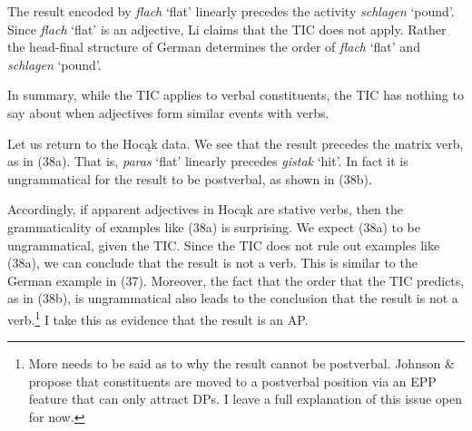\documentclass[output=paper]{LSP/langsci}
\begin{document}
The result encoded by \textit{flach} `flat' linearly precedes the activity \textit{schlagen} `pound'. Since \textit{flach} `flat' is an adjective, Li claims that the TIC does not apply. Rather the head-final structure of German determines the order of \textit{flach} `flat' and \textit{schlagen} `pound'. 

In summary, while the TIC applies to verbal constituents, the TIC has nothing to say about when adjectives form similar events with verbs.

Let us return to the Hocąk data. We see that the result precedes the matrix verb, as in (38a). That is, \textit{paras} `flat' linearly precedes \textit{gistak} `hit'. In fact it is ungrammatical for the result to be postverbal, as shown in (38b).

\begin{exe}
\ex
\begin{xlist}



\end{xlist}
\end{exe}

Accordingly, if apparent adjectives in Hocąk are stative verbs, then the grammaticality of examples like (38a) is surprising. We expect (38a) to be ungrammatical, given the TIC. Since the TIC does not rule out examples like (38a), we can conclude that the result is not a verb. This is similar to the German example in (37). Moreover, the fact that the order that the TIC predicts, as in (38b), is ungrammatical also leads to the conclusion that the result is not a verb.\footnote{More needs to be said as to why the result cannot be postverbal. Johnson \& \citet{Rosen2014} propose that constituents are moved to a postverbal position via an EPP feature that can only attract DPs. I leave a full explanation of this issue open for now.} I take this as evidence that the result is an AP.
\end{document}
